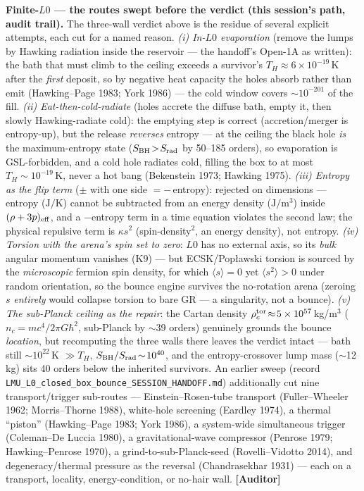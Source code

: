 \documentclass[11pt]{article}
\newcommand{\Auditor}{\textbf{\textcolor{teal!55!black}{[Auditor]}}}
\begin{document}
\textbf{Finite-$L0$ --- the routes swept before the verdict (this session's path, audit trail).} The three-wall verdict above is the residue of several explicit attempts, each cut for a named reason. \emph{(i) In-$L0$ evaporation} (remove the lumps by Hawking radiation inside the reservoir --- the handoff's Open-1A as written): the bath that must climb to the ceiling exceeds a survivor's $T_H\!\approx\!6\times10^{-19}$\,K after the \emph{first} deposit, so by negative heat capacity the holes absorb rather than emit (Hawking--Page 1983; York 1986) --- the cold window covers $\sim\!10^{-201}$ of the fill. \emph{(ii) Eat-then-cold-radiate} (holes accrete the diffuse bath, empty it, then slowly Hawking-radiate cold): the emptying step is correct (accretion/merger is entropy-up), but the release \emph{reverses} entropy --- at the ceiling the black hole \emph{is} the maximum-entropy state ($S_{\rm BH}\!>\!S_{\rm rad}$ by 50--185 orders), so evaporation is GSL-forbidden, and a cold hole radiates cold, filling the box to at most $T_H\!\sim\!10^{-19}$\,K, never a hot bang (Bekenstein 1973; Hawking 1975). \emph{(iii) Entropy as the flip term} ($\pm$ with one side $=-$\,entropy): rejected on dimensions --- entropy ($\mathrm{J/K}$) cannot be subtracted from an energy density ($\mathrm{J/m^3}$) inside $(\rho+3p)_{\rm eff}$, and a $-$entropy term in a time equation violates the second law; the physical repulsive term is $\kappa s^2$ (spin-density$^2$, an energy density), not entropy. \emph{(iv) Torsion with the arena's spin set to zero}: $L0$ has no external axis, so its \emph{bulk} angular momentum vanishes (K9) --- but ECSK/Popławski torsion is sourced by the \emph{microscopic} fermion spin density, for which $\langle s\rangle\!=\!0$ yet $\langle s^2\rangle\!>\!0$ under random orientation, so the bounce engine survives the no-rotation arena (zeroing $s$ \emph{entirely} would collapse torsion to bare GR --- a singularity, not a bounce). \emph{(v) The sub-Planck ceiling as the repair}: the Cartan density $\rho_c^{\rm tor}\!\approx\!5\times10^{57}$\,kg/m$^3$ ($n_c\!=\!mc^4/2\pi G\hbar^2$, sub-Planck by $\sim$39 orders) genuinely grounds the bounce \emph{location}, but recomputing the three walls there leaves the verdict intact --- bath still $\sim\!10^{22}$\,K $\gg\!T_H$, $S_{\rm BH}/S_{\rm rad}\!\sim\!10^{40}$, and the entropy-crossover lump mass ($\sim$12\,kg) sits 40 orders below the inherited survivors. An earlier sweep (record \texttt{LMU\_L0\_closed\_box\_bounce\_SESSION\_HANDOFF.md}) additionally cut nine transport/trigger sub-routes --- Einstein--Rosen-tube transport (Fuller--Wheeler 1962; Morris--Thorne 1988), white-hole screening (Eardley 1974), a thermal ``piston'' (Hawking--Page 1983; York 1986), a system-wide simultaneous trigger (Coleman--De Luccia 1980), a gravitational-wave compressor (Penrose 1979; Hawking--Penrose 1970), a grind-to-sub-Planck-seed (Rovelli--Vidotto 2014), and degeneracy/thermal pressure as the reversal (Chandrasekhar 1931) --- each on a transport, locality, energy-condition, or no-hair wall. \Auditor
\end{document}
